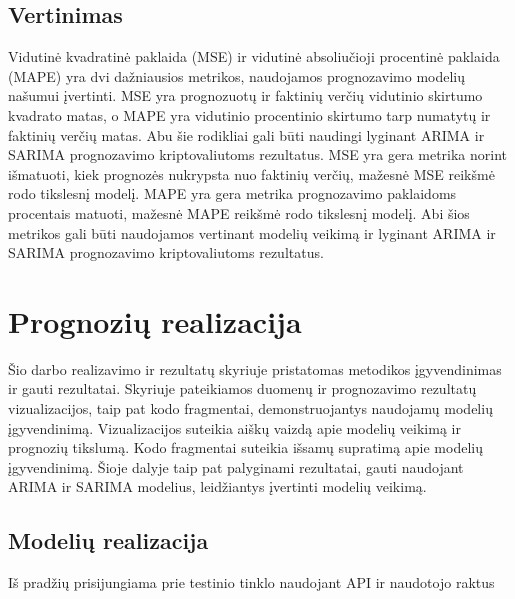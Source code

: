 \documentclass{VUMIFInfKursinis}
\begin{document}
\subsection{Vertinimas}

Vidutinė kvadratinė paklaida (MSE) ir vidutinė absoliučioji procentinė paklaida (MAPE) yra dvi dažniausios metrikos, naudojamos prognozavimo modelių našumui įvertinti.
MSE yra prognozuotų ir faktinių verčių vidutinio skirtumo kvadrato matas, o MAPE yra vidutinio procentinio skirtumo tarp numatytų ir faktinių verčių matas.
Abu šie rodikliai gali būti naudingi lyginant ARIMA ir SARIMA prognozavimo kriptovaliutoms rezultatus.
MSE yra gera metrika norint išmatuoti, kiek prognozės nukrypsta nuo faktinių verčių, mažesnė MSE reikšmė rodo tikslesnį modelį. 
MAPE yra gera metrika prognozavimo paklaidoms procentais matuoti, mažesnė MAPE reikšmė rodo tikslesnį modelį.
Abi šios metrikos gali būti naudojamos vertinant modelių veikimą ir lyginant ARIMA ir SARIMA prognozavimo kriptovaliutoms rezultatus.


\section{Prognozių realizacija}
Šio darbo realizavimo ir rezultatų skyriuje pristatomas metodikos įgyvendinimas ir gauti rezultatai. 
Skyriuje pateikiamos duomenų ir prognozavimo rezultatų vizualizacijos, taip pat kodo fragmentai, demonstruojantys naudojamų modelių įgyvendinimą.
Vizualizacijos suteikia aiškų vaizdą apie modelių veikimą ir prognozių tikslumą. 
Kodo fragmentai suteikia išsamų supratimą apie modelių įgyvendinimą. 
Šioje dalyje taip pat palyginami rezultatai, gauti naudojant ARIMA ir SARIMA modelius, leidžiantys įvertinti modelių veikimą.
\subsection{Modelių realizacija}

Iš pradžių prisijungiama prie testinio tinklo naudojant API ir naudotojo raktus
\end{document}
